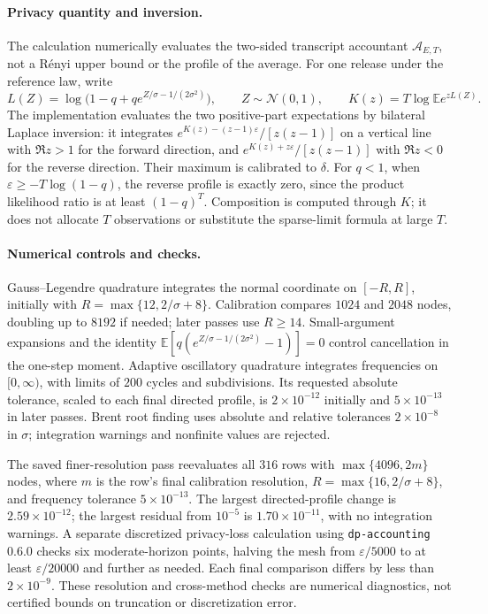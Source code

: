 \documentclass[11pt]{article}
\theoremstyle{remark}
\newcommand{\E}{\mathbb E}
\begin{document}
\paragraph{Privacy quantity and inversion.}
The calculation numerically evaluates the two-sided transcript accountant
$\mathcal A_{E,T}$, not a R\'enyi upper bound or the profile of the average.
For one release under the reference law, write
\[
 L(Z)=\log\bigl(1-q+q e^{Z/\sigma-1/(2\sigma^2)}\bigr),
 \qquad Z\sim\mathcal N(0,1),\qquad
 K(z)=T\log\E e^{zL(Z)}.
\]
The implementation evaluates the two positive-part expectations by
bilateral Laplace inversion: it integrates
$e^{K(z)-(z-1)\varepsilon}/[z(z-1)]$ on a vertical line with
$\Re z>1$ for the forward direction, and
$e^{K(z)+z\varepsilon}/[z(z-1)]$ with $\Re z<0$ for the reverse direction.
Their maximum is calibrated to $\delta$. For $q<1$, when
$\varepsilon\geq-T\log(1-q)$, the reverse profile is exactly zero,
since the product likelihood ratio is at least $(1-q)^T$.
Composition is computed through $K$; it does not allocate $T$ observations
or substitute the sparse-limit formula at large $T$.

\paragraph{Numerical controls and checks.}
Gauss--Legendre quadrature integrates the normal coordinate on
$[-R,R]$, initially with $R=\max\{12,2/\sigma+8\}$.
Calibration compares $1024$ and $2048$ nodes, doubling up to $8192$ if
needed; later passes use $R\geq14$. Small-argument expansions and the
identity $\E[q(e^{Z/\sigma-1/(2\sigma^2)}-1)]=0$ control cancellation
in the one-step moment. Adaptive oscillatory quadrature integrates
frequencies on $[0,\infty)$, with limits of $200$ cycles and subdivisions.
Its requested absolute tolerance, scaled to each final directed profile,
is $2\times10^{-12}$ initially and $5\times10^{-13}$ in later passes.
Brent root finding uses absolute and relative tolerances $2\times10^{-8}$
in $\sigma$; integration warnings and nonfinite values are rejected.

The saved finer-resolution pass reevaluates all $316$ rows with
$\max\{4096,2m\}$ nodes, where $m$ is the row's final calibration
resolution, $R=\max\{16,2/\sigma+8\}$, and frequency tolerance
$5\times10^{-13}$. The largest directed-profile change is
$2.59\times10^{-12}$; the largest residual from $10^{-5}$ is
$1.70\times10^{-11}$, with no integration warnings. A separate
discretized privacy-loss calculation using \texttt{dp-accounting} 0.6.0
checks six moderate-horizon points, halving the mesh from
$\varepsilon/5000$ to at least $\varepsilon/20000$ and further as needed.
Each final comparison differs by less than $2\times10^{-9}$.
These resolution and cross-method checks are numerical diagnostics,
not certified bounds on truncation or discretization error.
\end{document}
